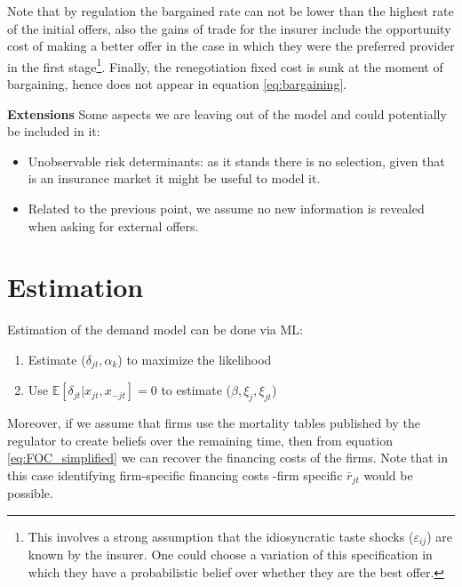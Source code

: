 \documentclass[12pt]{article}
\theoremstyle{plain}
\theoremstyle{plain}
\begin{document}


Note that by regulation the bargained rate can not be lower than the highest rate of the initial offers, also the gains of trade for the insurer include the opportunity cost of making a better offer in the case in which they were the preferred provider in the first stage\footnote{This involves a strong assumption that the idiosyncratic taste shocks ($\varepsilon_{ij}$) are known by the insurer. One could choose a variation of this specification in which they have a probabilistic belief over whether they are the best offer. }. Finally, the renegotiation fixed cost is sunk at the moment of bargaining, hence does not appear in equation \ref{eq:bargaining}. 

 




\textbf{Extensions}
Some aspects we are leaving out of the model and could potentially be included in it: 
\begin{itemize}
    \item Unobservable risk determinants: as it stands there is no selection, given that is an insurance market it might be useful to model it.

    \item Related to the previous point, we assume no new information is revealed when asking for external offers.
\end{itemize}
\vspace{4cm}

\section{Estimation}
Estimation of the demand model can be done via ML: 
\begin{enumerate}
    \item Estimate  ($\delta_{jt}, \alpha_k$) to maximize the likelihood 
    \item Use $\mathbb{E}[\delta_{jt}|x_{jt},x_{-jt}]= 0$ to estimate ($\beta, \xi_j, \xi_{jt}$)
\end{enumerate}

Moreover, if we assume that firms use the mortality tables published by the regulator to create beliefs over the remaining time, then from equation \ref{eq:FOC_simplified} we can recover the financing costs of the firms. Note that in this case identifying firm-specific financing costs -firm specific $\bar{r}_{jt}$ would be possible. 
\end{document}
